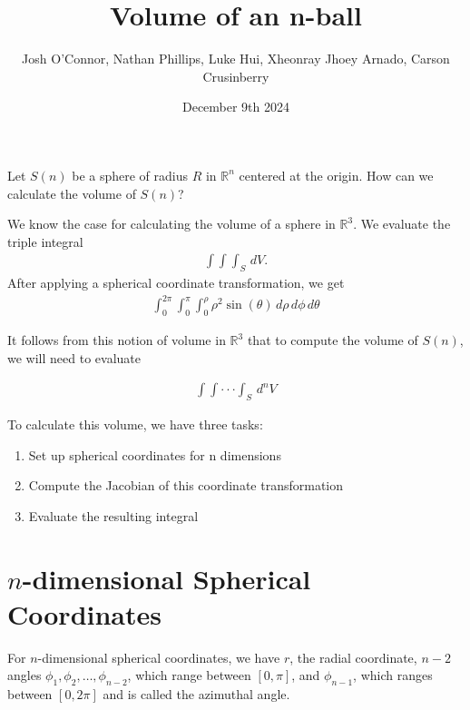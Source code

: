 \documentclass{article}
\title{Volume of an n-ball}
\author{Josh O'Connor, Nathan Phillips, Luke Hui, Xheonray Jhoey Arnado, Carson Crusinberry}
\date{December 9th 2024}
\begin{document}
\maketitle

Let $S(n)$ be a sphere of radius $R$ in $\mathbb{R}^n$ centered at the origin. How can we calculate the volume of $S(n)$?

We know the case for calculating the volume of a sphere in $\mathbb{R}^3$. We evaluate the triple integral 
    \begin{align*}
    \int\int\int_S\,dV. 
    \end{align*}
    After applying a spherical coordinate transformation, we get 
    \begin{align*}
    \int_0^{2\pi}\int_0^{\pi}\int_0^{\rho}\rho^2\sin(\theta)\,d\rho\,d\phi\,d\theta 
    \end{align*}

It follows from this notion of volume in $\mathbb{R}^3$ that to compute the volume of $S(n)$, we will need to evaluate

    \begin{align*}
        \int\int\cdot\cdot\cdot\int_S\,d^nV
    \end{align*}
    
    To calculate this volume, we have three tasks:
    \begin{enumerate}
        \item Set up spherical coordinates for n dimensions
        \item Compute the Jacobian of this coordinate transformation
        \item Evaluate the resulting integral
    \end{enumerate}
    
\section*{$n$-dimensional Spherical Coordinates}    
For $n$-dimensional spherical coordinates, we have $r$, the radial coordinate, $n-2$ angles $\phi_1, \phi_2, \dots, \phi_{n-2}$, which range between $[0, \pi]$, and $\phi_{n-1}$, which ranges between $[0, 2\pi]$ and is called the azimuthal angle.
\end{document}

